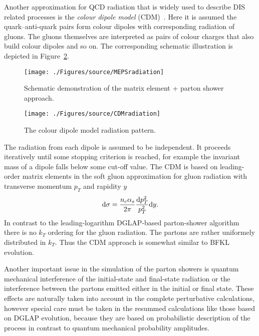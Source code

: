 Another approximation for QCD radiation that is widely used to describe DIS related processes is the \emph{colour dipole model} (CDM)~\cite{cdm}. Here it is assumed the quark--anti-quark pairs form colour dipoles with corresponding radiation of gluons. The gluons themselves are interpreted as pairs of colour charges that also build colour dipoles and so on. The corresponding schematic illustration is depicted in Figure~\ref{fig:cdm}. 
\begin{figure}[t]
	\centering
		\texttt{[image: ./Figures/source/MEPSradiation]}
	\caption{Schematic demonstration of the matrix element + parton shower approach.}
\label{fig:meps}
\end{figure}
\begin{figure}[t]%
\centering
\texttt{[image: ./Figures/source/CDMradiation]}%
\caption{The colour dipole model radiation pattern.}%
\label{fig:cdm}%
\end{figure}
The radiation from each dipole is assumed to be independent. It proceeds iteratively until some stopping criterion is reached, for example the invariant mass of a dipole falls below some cut-off  value. The CDM is based on leading-order matrix elements in the soft gluon approximation for gluon radiation with transverse momentum $p_T$ and rapidity $y$
\begin{equation}
\mathrm{d}\sigma = \frac{n_c\mbox{$\alpha_{s}$}}{2\pi}\frac{\mathrm{d}p_T^2}{p_T^2}\mathrm{d}y.
\end{equation}
In contrast to the leading-logarithm DGLAP-based parton-shower algorithm there is no $k_T$ ordering for the gluon radiation. The partons are rather uniformely distributed in $k_T$. Thus the CDM approach is somewhat similar to BFKL evolution.

Another important issue in the simulation of the parton showers is quantum mechanical interference of the initial-state and final-state radiation or the interference between the partons emitted either in the initial or final state. These effects are naturally taken into account in the complete perturbative calculations, however special care must be taken in the resummed calculations like those based on DGLAP evolution, because they are based on probabilistic description of the process in contrast to quantum mechanical probability amplitudes.

